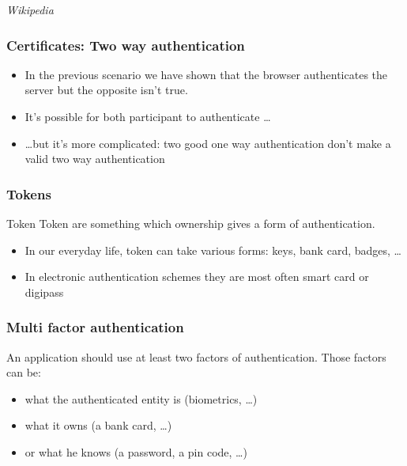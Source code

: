 
\begin{frame}
\end{frame}


\begin{frame}
\textit{Wikipedia}
\end{frame}


\begin{frame}
\frametitle{Certificates: Two way authentication}

\begin{itemize}
\item In the previous scenario we have shown that the browser authenticates
the server but the opposite isn't true.

\item It's possible for both participant to authenticate \ldots

\item \ldots but it's more complicated: two good one way
  authentication don't make a valid two way authentication
\end{itemize}

\end{frame}


\begin{frame}
\frametitle{Tokens}

\begin{block}{Token} Token are something which ownership gives a form
  of authentication.
\end{block}
\begin{itemize}
\item In our everyday life, token can take various forms: keys, bank card,
badges, \ldots
\item In electronic authentication schemes they are most often smart
  card or digipass
\end{itemize}
\end{frame}


\begin{frame}
\frametitle{Multi factor authentication}
 An application should use at least two factors of
 authentication. Those factors can be:
\begin{itemize}
\item what the authenticated entity is (biometrics, \ldots)
\item what it owns (a bank card, \ldots)
\item or what he knows (a password, a pin code, \ldots)
\end{itemize}
\end{frame}

